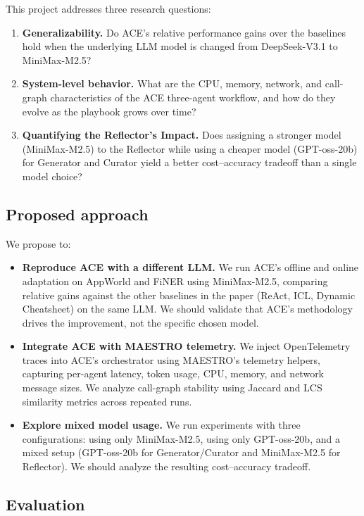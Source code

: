 \documentclass[letterpaper,twocolumn,10pt]{article}
\begin{document}
This project addresses three research questions:

\begin{enumerate}
    \item \textbf{Generalizability.} Do ACE's relative performance gains over the baselines hold when the underlying LLM model is changed from DeepSeek-V3.1 to MiniMax-M2.5?
    \item \textbf{System-level behavior.} What are the CPU, memory, network, and call-graph characteristics of the ACE three-agent workflow, and how do they evolve as the playbook grows over time?
    \item \textbf{Quantifying the Reflector's Impact.} Does assigning a stronger model (MiniMax-M2.5) to the Reflector while using a cheaper model (GPT-oss-20b) for Generator and Curator yield a better cost--accuracy tradeoff than a single model choice?
\end{enumerate}

\subsection{Proposed approach}

We propose to:

\begin{itemize}
    \item \textbf{Reproduce ACE with a different LLM.} We run ACE's offline and online adaptation on AppWorld and FiNER using MiniMax-M2.5, comparing relative gains against the other baselines in the paper (ReAct, ICL, Dynamic Cheatsheet) on the same LLM. We should validate that ACE's methodology drives the improvement, not the specific chosen model.

    \item \textbf{Integrate ACE with MAESTRO telemetry.} We inject OpenTelemetry traces into ACE's orchestrator using MAESTRO's telemetry helpers, capturing per-agent latency, token usage, CPU, memory, and network message sizes. We analyze call-graph stability using Jaccard and LCS similarity metrics across repeated runs.

    \item \textbf{Explore mixed model usage.} We run experiments with three configurations: using only MiniMax-M2.5, using only GPT-oss-20b, and a mixed setup (GPT-oss-20b for Generator/Curator and MiniMax-M2.5 for Reflector). We should analyze the resulting cost--accuracy tradeoff.
\end{itemize}

\subsection{Evaluation}
\end{document}
